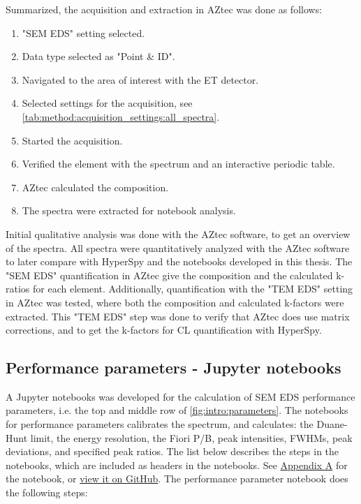 Summarized, the acquisition and extraction in AZtec was done as follows:
\begin{enumerate}
    \item "SEM EDS" setting selected.
    \item Data type selected as "Point \& ID".
    \item Navigated to the area of interest with the ET detector.
    \item Selected settings for the acquisition, see \cref{tab:method:acquisition_settings:all_spectra}.
    \item Started the acquisition.
    \item Verified the element with the spectrum and an interactive periodic table.
    \item AZtec calculated the composition.
    \item The spectra were extracted for notebook analysis.
\end{enumerate}


Initial qualitative analysis was done with the AZtec software, to get an overview of the spectra.
All spectra were quantitatively analyzed with the AZtec software to later compare with HyperSpy and the notebooks developed in this thesis.
The "SEM EDS" quantification in AZtec give the composition and the calculated k-ratios for each element.
Additionally, quantification with the "TEM EDS" setting in AZtec was tested, where both the composition and calculated k-factors were extracted.
This "TEM EDS" step was done to verify that AZtec does use matrix corrections, and to get the k-factors for CL quantification with HyperSpy.






\subsection{Performance parameters - Jupyter notebooks}
\label{method:data_treatment:notebook}

A Jupyter notebooks was developed for the calculation of SEM EDS performance parameters, i.e. the top and middle row of \cref{fig:intro:parameters}.
The notebooks for performance parameters calibrates the spectrum, and calculates: the Duane-Hunt limit, the energy resolution, the Fiori P/B, peak intensities, FWHMs, peak deviations, and specified peak ratios.
The list below describes the steps in the notebooks, which are included as headers in the notebooks.
See \hyperref[appendix:performance]{Appendix A} for the notebook, or \href{https://github.com/brynjarmorka/sem-eds-qc/blob/main/SEM_EDS_performance_parameters.ipynb}{view it on GitHub}.
The performance parameter notebook does the following steps:

